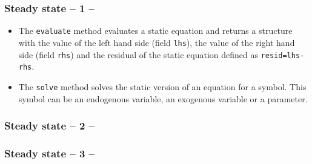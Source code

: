 \documentclass[10pt,slidestop]{beamer}
\theoremstyle{plain}
\begin{document}
\begin{frame}[c,fragile]
  \frametitle{Steady state -- 1 --}

  \begin{itemize}

  \item The \verb+evaluate+ method evaluates a static equation and
    returns a structure with the value of the left hand side (field
    \verb+lhs+), the value of the right hand side (field \verb+rhs+)
    and the residual of the static equation defined as
    \verb+resid=lhs-rhs+.\newline

    \medskip

  \item The \verb+solve+ method solves the static version of an
    equation for a symbol. This symbol can be an endogenous variable,
    an exogenous variable or a parameter.\newline

  \end{itemize}

\end{frame}


\begin{frame}[c,fragile]
  \frametitle{Steady state -- 2 --}

  \scalebox{.6}{
  }

\end{frame}

\begin{frame}[c,fragile]
  \frametitle{Steady state -- 3 --}

  \scalebox{1}{
  }

\end{frame}
\end{document}
